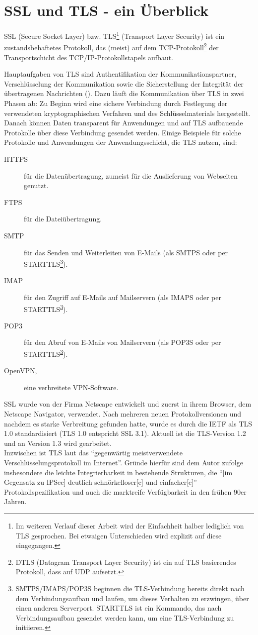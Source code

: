 \chapter{SSL und TLS - ein Überblick}

SSL (Secure Socket Layer) bzw. TLS\footnote{Im weiteren Verlauf dieser Arbeit wird der Einfachheit halber lediglich von TLS gesprochen. Bei etwaigen Unterschieden wird explizit auf diese eingegangen.} (Transport Layer Security) ist ein zustandsbehaftetes Protokoll, das (meist) auf dem TCP-Protokoll\footnote{DTLS (Datagram Transport Layer Security) ist ein auf TLS basierendes Protokoll, dass auf UDP aufsetzt.} der Transportschicht des TCP/IP-Protokollstapels aufbaut. 

Hauptaufgaben von TLS sind Authentifikation der Kommunikationspartner, Verschlüsselung der Kommunikation sowie die Sicherstellung der Integrität der übertragenen Nachrichten (\cite{meyer14}). Dazu läuft die Kommunikation über TLS in zwei Phasen ab: Zu Beginn wird eine sichere Verbindung durch Festlegung der verwendeten kryptographischen Verfahren und des Schlüsselmaterials hergestellt. Danach können Daten transparent für Anwendungen und auf TLS aufbauende Protokolle über diese Verbindung gesendet werden. Einige Beispiele für solche Protokolle und Anwendungen der Anwendungsschicht, die TLS nutzen, sind:
\begin{description}
\item[HTTPS] für die Datenübertragung, zumeist für die Auslieferung von Webseiten genutzt. 
\item[FTPS] für die Dateiübertragung.
\item[SMTP] für das Senden und Weiterleiten von E-Mails (als SMTPS oder per STARTTLS\footnote{\label{fn_starttls}SMTPS/IMAPS/POP3S beginnen die TLS-Verbindung bereits direkt nach dem Verbindungsaufbau und laufen, um dieses Verhalten zu erzwingen, über einen anderen Serverport. STARTTLS ist ein Kommando, das nach Verbindungsaufbau gesendet werden kann, um eine TLS-Verbindung zu initiieren.}).
\item[IMAP] für den Zugriff auf E-Mails auf Mailservern (als IMAPS oder per STARTTLS\textsuperscript{\ref{fn_starttls}}).
\item[POP3] für den Abruf von E-Mails von Mailservern (als POP3S oder per STARTTLS\textsuperscript{\ref{fn_starttls}}).
\item[OpenVPN,] eine verbreitete VPN-Software.
\end{description}

SSL wurde von der Firma Netscape entwickelt und zuerst in ihrem Browser, dem Netscape Navigator, verwendet. Nach mehreren neuen Protokollversionen und nachdem es starke Verbreitung gefunden hatte, wurde es durch die IETF als TLS 1.0 standardisiert (TLS 1.0 entspricht SSL 3.1). Aktuell ist die TLS-Version 1.2 und an Version 1.3 wird gearbeitet.\\
Inzwischen ist TLS laut \cite{schmeh09} das "`gegenwärtig meistverwendete Verschlüsselungsprotokoll im Internet"'. Gründe hierfür sind dem Autor zufolge insbesondere die leichte Integrierbarkeit in bestehende Strukturen, die "`[im Gegensatz zu IPSec] deutlich schnörkelloser[e] und einfacher[e]"' Protokollspezifikation und auch die marktreife Verfügbarkeit in den frühen 90er Jahren.

